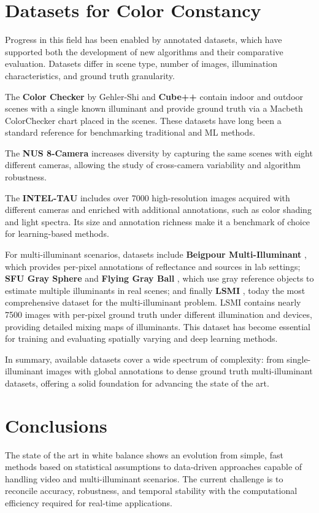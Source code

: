 \section{Datasets for Color Constancy}

Progress in this field has been enabled by annotated datasets, which have supported both the development of new algorithms and their comparative evaluation. Datasets differ in scene type, number of images, illumination characteristics, and ground truth granularity.

The \textbf{Color Checker} by Gehler-Shi \cite{gehler_bayesian_2008} and \textbf{Cube++} \cite{ershov_cube_2020} contain indoor and outdoor scenes with a single known illuminant and provide ground truth via a Macbeth ColorChecker chart placed in the scenes. These datasets have long been a standard reference for benchmarking traditional and ML methods.

The \textbf{NUS 8-Camera} \cite{cheng_illuminant_2014} increases diversity by capturing the same scenes with eight different cameras, allowing the study of cross-camera variability and algorithm robustness.

The \textbf{INTEL-TAU} \cite{laakom_intel-tau_2020} includes over 7000 high-resolution images acquired with different cameras and enriched with additional annotations, such as color shading and light spectra. Its size and annotation richness make it a benchmark of choice for learning-based methods.

For multi-illuminant scenarios, datasets include \textbf{Beigpour Multi-Illuminant} \cite{beigpour_multi-illuminant_2013}, which provides per-pixel annotations of reflectance and sources in lab settings; \textbf{SFU Gray Sphere} and \textbf{Flying Gray Ball} \cite{ciurea_large_2003,aghaei_flying_2020}, which use gray reference objects to estimate multiple illuminants in real scenes; and finally \textbf{LSMI} \cite{kim_large_2021}, today the most comprehensive dataset for the multi-illuminant problem. LSMI contains nearly 7500 images with per-pixel ground truth under different illumination and devices, providing detailed mixing maps of illuminants. This dataset has become essential for training and evaluating spatially varying and deep learning methods.

In summary, available datasets cover a wide spectrum of complexity: from single-illuminant images with global annotations to dense ground truth multi-illuminant datasets, offering a solid foundation for advancing the state of the art.

\section{Conclusions}

The state of the art in white balance shows an evolution from simple, fast methods based on statistical assumptions to data-driven approaches capable of handling video and multi-illuminant scenarios. The current challenge is to reconcile accuracy, robustness, and temporal stability with the computational efficiency required for real-time applications.

